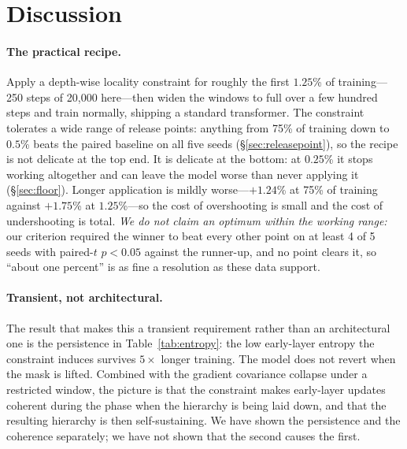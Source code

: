 \documentclass[11pt,a4paper]{article}
\begin{document}
\section{Discussion}

\paragraph{The practical recipe.} Apply a depth-wise locality constraint for roughly the first $1.25$\% of training---250 steps of 20{,}000 here---then widen the windows to full over a few hundred steps and train normally, shipping a standard transformer. The constraint tolerates a wide range of release points: anything from 75\% of training down to $0.5$\% beats the paired baseline on all five seeds (\S\ref{sec:releasepoint}), so the recipe is not delicate at the top end. It is delicate at the bottom: at $0.25$\% it stops working altogether and can leave the model worse than never applying it (\S\ref{sec:floor}). Longer application is mildly worse---$+1.24$\% at 75\% of training against $+1.75$\% at $1.25$\%---so the cost of overshooting is small and the cost of undershooting is total. \emph{We do not claim an optimum within the working range:} our criterion required the winner to beat every other point on at least 4 of 5 seeds with paired-$t$ $p<0.05$ against the runner-up, and no point clears it, so ``about one percent'' is as fine a resolution as these data support.

\paragraph{Transient, not architectural.} The result that makes this a transient requirement rather than an architectural one is the persistence in Table~\ref{tab:entropy}: the low early-layer entropy the constraint induces survives $5\times$ longer training. The model does not revert when the mask is lifted. Combined with the gradient covariance collapse under a restricted window, the picture is that the constraint makes early-layer updates coherent during the phase when the hierarchy is being laid down, and that the resulting hierarchy is then self-sustaining. We have shown the persistence and the coherence separately; we have not shown that the second causes the first.
\end{document}
